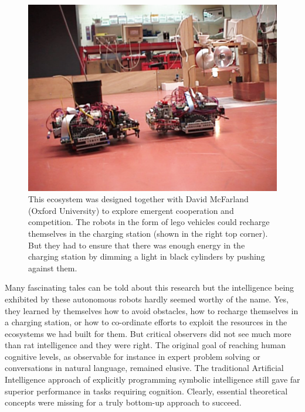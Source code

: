 \begin{figure}[htbp]
  \centerline{\includegraphics[width=.80\textwidth]{chap1/figs/ecosystem}}
\caption{ This ecosystem was designed together with David McFarland (Oxford University) to explore 
emergent cooperation and competition. The robots in the form of lego vehicles could recharge themselves in the charging 
station (shown in the right top corner). But they had to ensure that there was enough energy in the charging 
station by dimming a light in black cylinders by pushing against them.}
\label{f:plate6}
\end{figure}

Many fascinating tales can be told about this research but the intelligence being exhibited 
by these autonomous robots hardly seemed worthy of the name. Yes, they learned
by themselves how to avoid obstacles, how to recharge themselves
in a charging station, or how to co-ordinate efforts 
to exploit the resources in the ecosystems we had built for 
them. But critical observers did not see much more than 
rat intelligence and they were right. The original 
goal of reaching human 
cognitive levels, as observable for instance in 
expert problem solving or conversations in natural
language, remained elusive. The 
traditional Artificial Intelligence
approach of explicitly programming symbolic intelligence
still gave far superior performance in tasks requiring
cognition. Clearly, essential theoretical concepts were 
missing for a truly bottom-up approach to succeed. 

